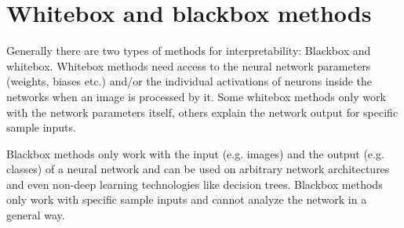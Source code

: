 \section{Whitebox and blackbox methods}
Generally there are two types of methods for interpretability: Blackbox and whitebox. Whitebox methods need access to the neural network parameters (weights, biases etc.) and/or the individual activations of neurons inside the networks when an image is processed by it. Some whitebox methods only work with the network parameters itself, others explain the network output for specific sample inputs.

Blackbox methods only work with the input (e.g. images) and the output (e.g. classes) of a neural network and can be used on arbitrary network architectures and even non-deep learning technologies like decision trees. Blackbox methods only work with specific sample inputs and cannot analyze the network in a general way.
